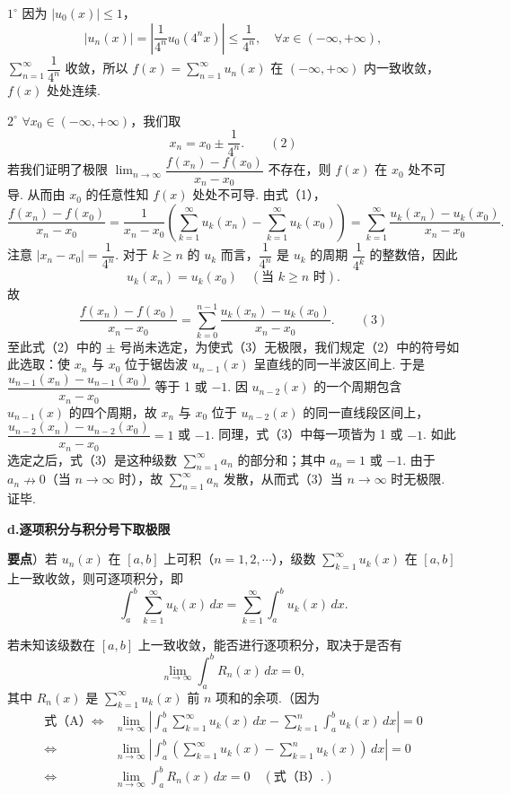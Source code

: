 \documentclass[UTF8, 12pt, fontset=fandol, oneside]{ctexart}
\begin{document}
$1^\circ$ 因为 $|u_0(x)|\le1$，
\[
  |u_n(x)|=\left|\frac1{4^n}u_0(4^nx)\right|\le\frac1{4^n},
  \quad\forall x\in(-\infty,+\infty),
\]
$\displaystyle\sum_{n=1}^{\infty}\dfrac1{4^n}$ 收敛，所以
$f(x)=\displaystyle\sum_{n=1}^{\infty}u_n(x)$ 在
$(-\infty,+\infty)$ 内一致收敛，$f(x)$ 处处连续.

$2^\circ$ $\forall x_0\in(-\infty,+\infty)$，我们取
\[
  x_n=x_0\pm\frac1{4^n}.
\qquad(2)
\]
若我们证明了极限
$\displaystyle\lim_{n\to\infty}\dfrac{f(x_n)-f(x_0)}{x_n-x_0}$ 不存在，则
$f(x)$ 在 $x_0$ 处不可导. 从而由 $x_0$ 的任意性知 $f(x)$ 处处不可导. 由式（1），
\[
  \frac{f(x_n)-f(x_0)}{x_n-x_0}
  =\frac1{x_n-x_0}\left(\sum_{k=1}^{\infty}u_k(x_n)-\sum_{k=1}^{\infty}u_k(x_0)\right)
  =\sum_{k=1}^{\infty}\frac{u_k(x_n)-u_k(x_0)}{x_n-x_0}.
\]
注意 $|x_n-x_0|=\dfrac1{4^n}$. 对于 $k\ge n$ 的 $u_k$ 而言，$\dfrac1{4^n}$ 是
$u_k$ 的周期 $\dfrac1{4^k}$ 的整数倍，因此
\[
  u_k(x_n)=u_k(x_0)\quad(\text{当 }k\ge n\text{ 时}).
\]
故
\[
  \frac{f(x_n)-f(x_0)}{x_n-x_0}
  =\sum_{k=0}^{n-1}\frac{u_k(x_n)-u_k(x_0)}{x_n-x_0}.
\qquad(3)
\]
至此式（2）中的 $\pm$ 号尚未选定，为使式（3）无极限，我们规定（2）中的符号如此选取：使
$x_n$ 与 $x_0$ 位于锯齿波 $u_{n-1}(x)$ 呈直线的同一半波区间上. 于是
$\dfrac{u_{n-1}(x_n)-u_{n-1}(x_0)}{x_n-x_0}$ 等于 1 或 $-1$. 因
$u_{n-2}(x)$ 的一个周期包含 $u_{n-1}(x)$ 的四个周期，故 $x_n$ 与 $x_0$ 位于
$u_{n-2}(x)$ 的同一直线段区间上，
$\dfrac{u_{n-2}(x_n)-u_{n-2}(x_0)}{x_n-x_0}=1$ 或 $-1$. 同理，式（3）中每一项皆为 1 或
$-1$. 如此选定之后，式（3）是这种级数 $\displaystyle\sum_{n=1}^{\infty}a_n$ 的部分和；其中
$a_n=1$ 或 $-1$. 由于 $a_n\nrightarrow0$（当 $n\to\infty$ 时），故
$\displaystyle\sum_{n=1}^{\infty}a_n$ 发散，从而式（3）当 $n\to\infty$ 时无极限. 证毕.

\noindent\textbf{d.\quad 逐项积分与积分号下取极限}

\noindent\textbf{要点}）若 $u_n(x)$ 在 $[a,b]$ 上可积（$n=1,2,\cdots$），级数
$\displaystyle\sum_{k=1}^{\infty}u_k(x)$ 在 $[a,b]$ 上一致收敛，则可逐项积分，即
\[
  \int_a^b\sum_{k=1}^{\infty}u_k(x)\,dx
  =\sum_{k=1}^{\infty}\int_a^b u_k(x)\,dx.
\tag{A}
\]

若未知该级数在 $[a,b]$ 上一致收敛，能否进行逐项积分，取决于是否有
\[
  \lim_{n\to\infty}\int_a^b R_n(x)\,dx=0,
\tag{B}
\]
其中 $R_n(x)$ 是 $\displaystyle\sum_{k=1}^{\infty}u_k(x)$ 前 $n$ 项和的余项.（因为
\[
\begin{aligned}
\text{式（A）}\Longleftrightarrow{}&
\lim_{n\to\infty}\left|\int_a^b\sum_{k=1}^{\infty}u_k(x)\,dx
-\sum_{k=1}^n\int_a^b u_k(x)\,dx\right|=0\\
\Longleftrightarrow{}&
\lim_{n\to\infty}\left|\int_a^b\left(\sum_{k=1}^{\infty}u_k(x)-\sum_{k=1}^n u_k(x)\right)\,dx\right|=0\\
\Longleftrightarrow{}&
\lim_{n\to\infty}\int_a^b R_n(x)\,dx=0\quad(\text{式（B）}.)
\end{aligned}
\]
\end{document}
